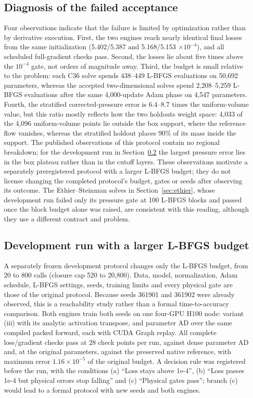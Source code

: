 \documentclass[11pt]{article}
\begin{document}
\subsection{Diagnosis of the failed acceptance}
Four observations indicate that the failure is limited by optimization
rather than by derivative execution. First, the two engines reach nearly
identical final losses from the same initialization (5.402/5.387 and
5.168/5.153 $\times10^{-4}$), and all scheduled full-gradient checks pass.
Second, the losses lie about five times above the $10^{-4}$ gate, not orders
of magnitude away. Third, the budget is small relative to the problem: each
C36 solve spends 438--449 L-BFGS evaluations on 50,692 parameters, whereas
the accepted two-dimensional solves spend 2,208--5,259 L-BFGS evaluations
after the same 4,000-update Adam phase on 4,547 parameters. Fourth, the
stratified corrected-pressure error is 6.4--8.7 times the uniform-volume
value, but this ratio mostly reflects how the two holdouts weight space:
4,033 of the 4,096 uniform-volume points lie outside the box support, where
the reference flow vanishes, whereas the stratified holdout places 90\% of
its mass inside the support. The published observations of this protocol
contain no regional breakdown; for the development run in
Section~\ref{sec:c36v2} the largest pressure error lies in the box plateau
rather than in the cutoff layers. These observations motivate a separately
preregistered protocol with a larger L-BFGS budget; they do not license
changing the completed protocol's budget, gates or seeds after observing
its outcome. The Ethier--Steinman solves in Section~\ref{sec:ethier}, whose
development run failed only its pressure gate at 100 L-BFGS blocks and
passed once the block budget alone was raised, are consistent with this
reading, although they use a different contract and problem.

\subsection{Development run with a larger L-BFGS budget}\label{sec:c36v2}
A separately frozen development protocol changes only the L-BFGS budget,
from 20 to 800 calls (closure cap 520 to 20,800). Data, model,
normalization, Adam schedule, L-BFGS settings, seeds, training limits and
every physical gate are those of the original protocol. Because seeds
361901 and 361902 were already observed, this is a reachability study
rather than a formal time-to-accuracy comparison. Both engines train both
seeds on one four-GPU H100 node: variant (iii) with its analytic activation
transpose, and parameter AD over the same compiled packed forward, each with
CUDA Graph replay. All complete loss/gradient checks pass at 28 check
points per run, against dense parameter AD and, at the original parameters,
against the preserved native reference, with maximum error
$1.16\times10^{-5}$ of the original budget. A decision rule was registered
before the run, with the conditions (a) ``Loss stays above 1e-4'', (b)
``Loss passes 1e-4 but physical errors stop falling'' and (c) ``Physical
gates pass''; branch (c) would lead to a formal protocol with new seeds and
both engines.
\end{document}
